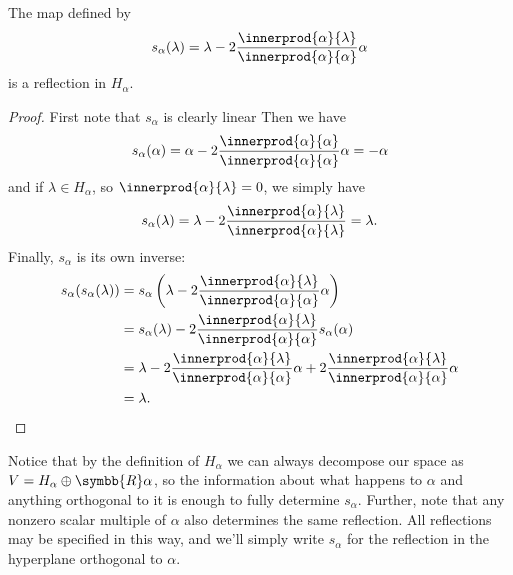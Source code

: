 \documentclass[fleqn, a4paper, openany]{memoir}
\newcommand{\reals}{\symbb{R}}
\begin{document}
    \begin{lma}{}{}
        The map defined by
        \begin{equation}
            s_\alpha(\lambda) = \lambda - 2\frac{\innerprod{\alpha}{\lambda}}{\innerprod{\alpha}{\alpha}} \alpha
        \end{equation}
        is a reflection in \(H_\alpha\).
        \begin{proof}
            First note that \(s_\alpha\) is clearly linear
            Then we have
            \begin{equation}
                s_\alpha(\alpha) = \alpha - 2\frac{\innerprod{\alpha}{\alpha}}{\innerprod{\alpha}{\alpha}} \alpha = -\alpha
            \end{equation}
            and if \(\lambda \in H_\alpha\), so \(\innerprod{\alpha}{\lambda} = 0\), we simply have
            \begin{equation}
                s_\alpha(\lambda) = \lambda - 2\frac{\innerprod{\alpha}{\lambda}}{\innerprod{\alpha}{\lambda}} = \lambda.
            \end{equation}
            Finally, \(s_\alpha\) is its own inverse:
            \begin{align}
                s_\alpha(s_\alpha(\lambda)) &= s_\alpha\left( \lambda - 2\frac{\innerprod{\alpha}{\lambda}}{\innerprod{\alpha}{\alpha}}\alpha \right)\\
                &= s_\alpha(\lambda) - 2\frac{\innerprod{\alpha}{\lambda}}{\innerprod{\alpha}{\alpha}}s_\alpha(\alpha)\\
                &= \lambda - 2\frac{\innerprod{\alpha}{\lambda}}{\innerprod{\alpha}{\alpha}}\alpha + 2\frac{\innerprod{\alpha}{\lambda}}{\innerprod{\alpha}{\alpha}}\alpha\\
                &= \lambda. \notag \qedhere
            \end{align}
        \end{proof}
    \end{lma}
    
    Notice that by the definition of \(H_\alpha\) we can always decompose our space as \(V = H_\alpha \oplus \reals \alpha\), so the information about what happens to \(\alpha\) and anything orthogonal to it is enough to fully determine \(s_\alpha\).
    Further, note that any nonzero scalar multiple of \(\alpha\) also determines the same reflection.
    All reflections may be specified in this way, and we'll simply write \(s_\alpha\) for the reflection in the hyperplane orthogonal to \(\alpha\).
    
\end{document}

